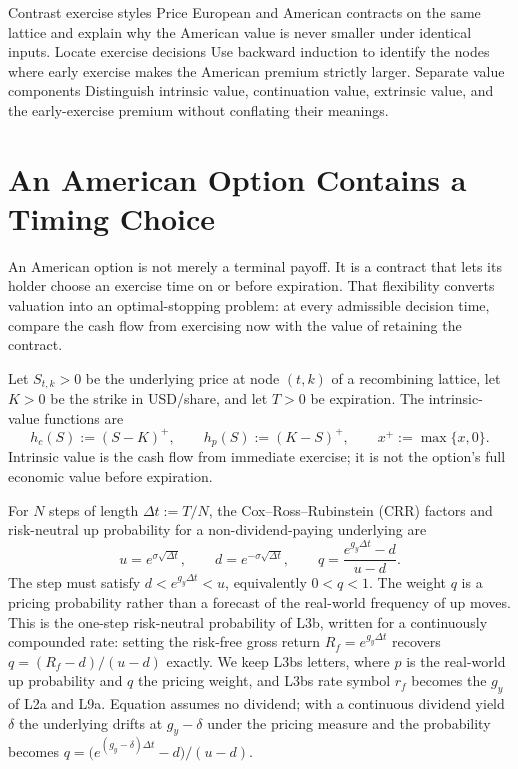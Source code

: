 \documentclass[11pt]{article}
\begin{document}

\learningobjectives
  {Contrast exercise styles}
  {Price European and American contracts on the same lattice and explain why the American value is never smaller under identical inputs.}
  {Locate exercise decisions}
  {Use backward induction to identify the nodes where early exercise makes the American premium strictly larger.}
  {Separate value components}
  {Distinguish intrinsic value, continuation value, extrinsic value, and the early-exercise premium without conflating their meanings.}

\section{An American Option Contains a Timing Choice}

An American option is not merely a terminal payoff. It is a contract that lets its holder choose an exercise time on or before expiration. That flexibility converts valuation into an optimal-stopping problem: at every admissible decision time, compare the cash flow from exercising now with the value of retaining the contract.

Let $S_{t,k}>0$ be the underlying price at node $(t,k)$ of a recombining lattice, let $K>0$ be the strike in USD/share, and let $T>0$ be expiration. The intrinsic-value functions are
\begin{equation}
  \label{eq:intrinsic}
  h_c(S):=(S-K)^+,
  \qquad
  h_p(S):=(K-S)^+,
  \qquad x^+:=\max\{x,0\}.
\end{equation}
Intrinsic value is the cash flow from immediate exercise; it is not the option's full economic value before expiration.

For $N$ steps of length $\Delta t:=T/N$, the Cox--Ross--Rubinstein (CRR) factors and risk-neutral up probability for a non-dividend-paying underlying are
\begin{equation}
  \label{eq:crr-parameters}
  u=e^{\sigma\sqrt{\Delta t}},
  \qquad
  d=e^{-\sigma\sqrt{\Delta t}},
  \qquad
  q=\frac{e^{g_y\Delta t}-d}{u-d}.
\end{equation}
The step must satisfy $d<e^{g_y\Delta t}<u$, equivalently $0<q<1$. The weight $q$ is a pricing probability rather than a forecast of the real-world frequency of up moves. This is the one-step risk-neutral probability of L3b, written for a continuously compounded rate: setting the risk-free gross return $R_f=e^{g_y\Delta t}$ recovers $q=(R_f-d)/(u-d)$ exactly. We keep L3bs letters, where $p$ is the real-world up probability and $q$ the pricing weight, and L3bs rate symbol $r_f$ becomes the $g_y$ of L2a and L9a. Equation  assumes no dividend; with a continuous dividend yield $\delta$ the underlying drifts at $g_y-\delta$ under the pricing measure and the probability becomes $q=\bigl(e^{(g_y-\delta)\Delta t}-d\bigr)/(u-d)$.
\end{document}
